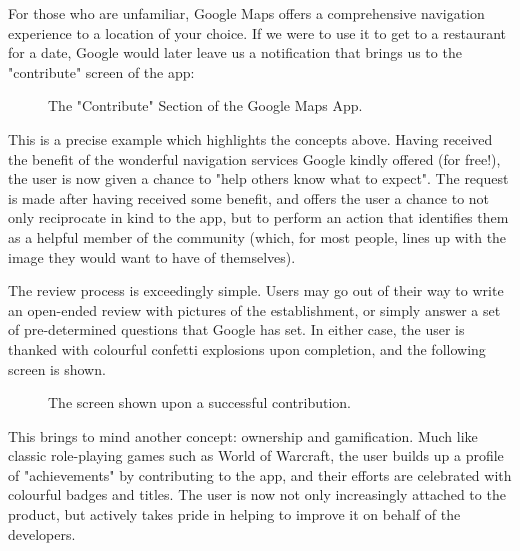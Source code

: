 For those who are unfamiliar, Google Maps offers a comprehensive navigation experience to a location of your choice. If we were to use it to get to a restaurant for a date, Google would later leave us a notification that brings us to the "contribute" screen of the app:

\begin{figure}[h]
    \begin{center}
        \fbox{\rule{0pt}{1.2in} \rule{0.99\linewidth}{0pt}}
    \end{center}
    \caption{The "Contribute" Section of the Google Maps App.}
    \label{fig:gmaps_contribute}
\end{figure}

This is a precise example which highlights the concepts above. Having received the benefit of the wonderful navigation services Google kindly offered (for free!), the user is now given a chance to "help others know what to expect". The request is made after having received some benefit, and offers the user a chance to not only reciprocate in kind to the app, but to perform an action that identifies them as a helpful member of the community (which, for most people, lines up with the image they would want to have of themselves).

The review process is exceedingly simple. Users may go out of their way to write an open-ended review with pictures of the establishment, or simply answer a set of pre-determined questions that Google has set. In either case, the user is thanked with colourful confetti explosions upon completion, and the following screen is shown.

\begin{figure}[h]
    \begin{center}
        \fbox{\rule{0pt}{1.2in} \rule{0.99\linewidth}{0pt}}
    \end{center}
    \caption{The screen shown upon a successful contribution.}
    \label{fig:gmaps_contrib_finish}
\end{figure}

This brings to mind another concept: ownership and gamification. Much like classic role-playing games such as World of Warcraft, the user builds up a profile of "achievements" by contributing to the app, and their efforts are celebrated with colourful badges and titles. The user is now not only increasingly attached to the product, but actively takes pride in helping to improve it on behalf of the developers.

